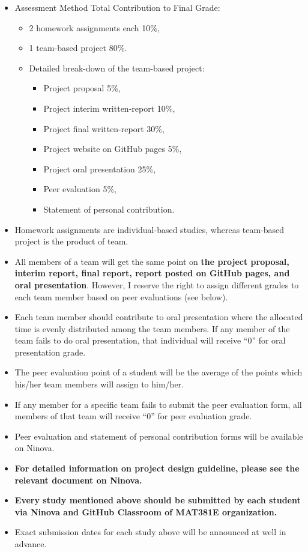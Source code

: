 \documentclass[
  12pt,
]{article}
\providecommand{\tightlist}{%
  \setlength{\itemsep}{0pt}\setlength{\parskip}{0pt}}
\begin{document}
\begin{itemize}
\item
  Assessment Method Total Contribution to Final Grade:

  \begin{itemize}
  \tightlist
  \item
    2 homework assignments each 10\%,
  \item
    1 team-based project 80\%.
  \item
    Detailed break-down of the team-based project:

    \begin{itemize}
    \tightlist
    \item
      Project proposal 5\%,
    \item
      Project interim written-report 10\%,
    \item
      Project final written-report 30\%,
    \item
      Project website on GitHub pages 5\%,
    \item
      Project oral presentation 25\%,
    \item
      Peer evaluation 5\%,
    \item
      Statement of personal contribution.
    \end{itemize}
  \end{itemize}
\item
  Homework assignments are individual-based studies, whereas team-based
  project is the product of team.
\item
  All members of a team will get the same point on \textbf{the project
  proposal, interim report, final report, report posted on GitHub pages,
  and oral presentation}. However, I reserve the right to assign
  different grades to each team member based on peer evaluations (see
  below).
\item
  Each team member should contribute to oral presentation where the
  allocated time is evenly distributed among the team members. If any
  member of the team fails to do oral presentation, that individual will
  receive ``0'' for oral presentation grade.
\item
  The peer evaluation point of a student will be the average of the
  points which his/her team members will assign to him/her.
\item
  If any member for a specific team fails to submit the peer evaluation
  form, all members of that team will receive ``0'' for peer evaluation
  grade.
\item
  Peer evaluation and statement of personal contribution forms will be
  available on Ninova.
\item
  \textbf{For detailed information on project design guideline, please
  see the relevant document on Ninova.}
\item
  \textbf{Every study mentioned above should be submitted by each
  student via Ninova and GitHub Classroom of MAT381E organization.}
\item
  Exact submission dates for each study above will be announced at well
  in advance.
\end{itemize}
\end{document}
